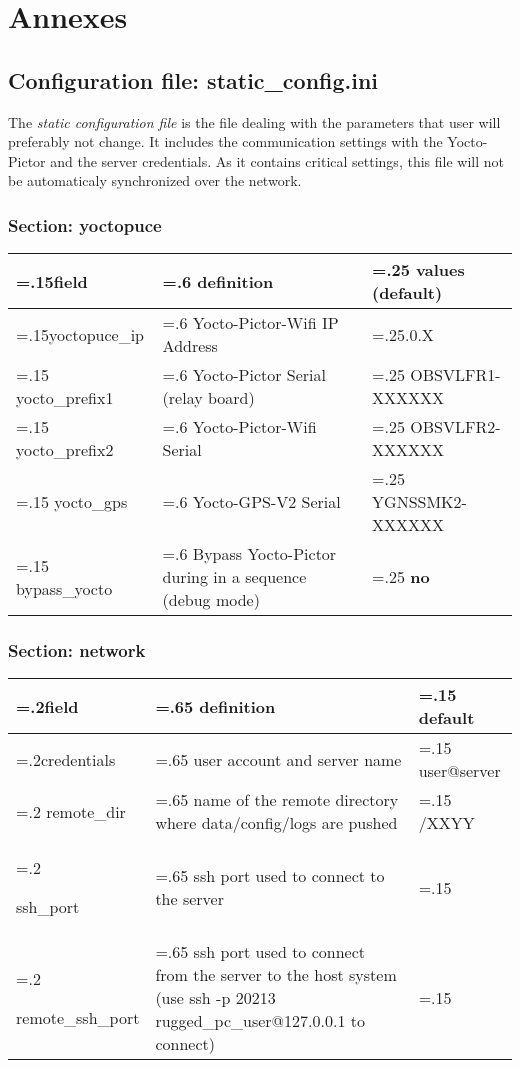 \section{Annexes}

\subsection{Configuration file: static\_config.ini}
\label{annex:staticconfig}

The \emph{static configuration file} is the file dealing with the parameters
that user will preferably not change. It includes the communication 
settings with the Yocto-Pictor and the server
credentials. As it contains critical settings, this file will not be 
automaticaly synchronized over the network.

\subsubsection{Section: yoctopuce}
\label{annex:configYocto}
\begin{tabularx}{\textwidth} {
        | >{\hsize=.15\hsize}X
        | >{\hsize=.6\hsize}X
		| >{\hsize=.25\hsize}X | }
	\hline
	\textbf{field} & \textbf{definition} & values (\textbf{default}) \\
	\hline
	\hline
	yoctopuce\_ip &	Yocto-Pictor-Wifi IP Address & 10.42.0.X
	\\ \hline
	yocto\_prefix1 & Yocto-Pictor Serial (relay board) & OBSVLFR1-XXXXXX
	\\ \hline
	yocto\_prefix2 & Yocto-Pictor-Wifi Serial &	OBSVLFR2-XXXXXX
	\\ \hline
	yocto\_gps & Yocto-GPS-V2 Serial & YGNSSMK2-XXXXXX
	\\ \hline
	bypass\_yocto & Bypass Yocto-Pictor during in a sequence (debug mode) & 
	\textbf{no} \\ \hline
\end{tabularx}

\subsubsection{Section: network}
\label{annex:configNetwork}

\begin{tabularx}{\textwidth} {
		| >{\hsize=.2\hsize}X
        | >{\hsize=.65\hsize}X
		| >{\hsize=.15\hsize}X | }
	\hline
	\textbf{field} & \textbf{definition} & \textbf{default} \\
	\hline
	\hline
	credentials & user account and server name & user@server 
	\\ \hline
	remote\_dir & name of the remote directory where data/config/logs are
	pushed & \texttildelow/XXYY 
	\\ \hline

	ssh\_port &	ssh port used to connect to the server & 22
	\\ \hline

	remote\_ssh\_port & ssh port used to connect from the server to the host
	system (use ssh -p 20213 rugged\_pc\_user@127.0.0.1 to connect)
	& 20213
	\\ \hline

\end{tabularx}


